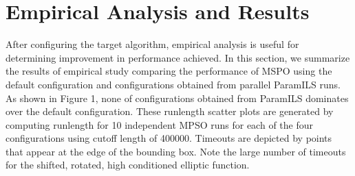 \section{Empirical Analysis and Results}

After configuring the target algorithm, empirical analysis is useful for determining improvement in performance achieved. In this section, we summarize the results of empirical study comparing the performance of MSPO using the default configuration and configurations obtained from parallel ParamILS runs.\\

As shown in Figure 1, none of configurations obtained from ParamILS dominates over the default configuration. These runlength scatter plots are generated by computing runlength for 10 independent MPSO runs for each of the four configurations using cutoff length of 400000. Timeouts are depicted by points that appear at the edge of the bounding box. Note the large number of timeouts for the shifted, rotated, high conditioned elliptic function.\\
	
